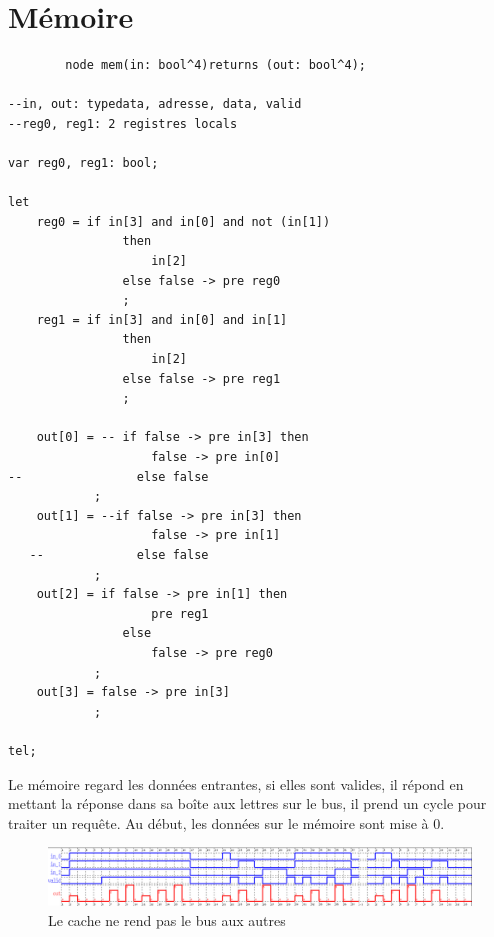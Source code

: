 \documentclass[a4paper,11pt]{report}
\begin{document}
\chapter{Mémoire}
	\begin{framed}
		\begin{verbatim}
		node mem(in: bool^4)returns (out: bool^4);

--in, out: typedata, adresse, data, valid
--reg0, reg1: 2 registres locals

var reg0, reg1: bool;

let
    reg0 = if in[3] and in[0] and not (in[1])
                then
                    in[2]
                else false -> pre reg0
                ;
    reg1 = if in[3] and in[0] and in[1]
                then
                    in[2]
                else false -> pre reg1
                ;

    out[0] = -- if false -> pre in[3] then
                    false -> pre in[0]
--                else false
            ;
    out[1] = --if false -> pre in[3] then
                    false -> pre in[1]
   --             else false
            ;
    out[2] = if false -> pre in[1] then
                    pre reg1
                else
                    false -> pre reg0
            ;
    out[3] = false -> pre in[3]
            ;

tel;

		\end{verbatim}
	\end{framed}
	
	Le mémoire regard les données entrantes, si elles sont valides, il répond en mettant la réponse dans sa boîte aux lettres sur le bus, il prend un cycle pour traiter un requête. Au début, les données sur le mémoire sont mise à 0.
	
	\begin{figure}[!htbp]
		
		\includegraphics[width = 16cm]{arb_diag_1.png}
		\caption{Le cache ne rend pas le bus aux autres}
	\end{figure}
	
\end{document}
